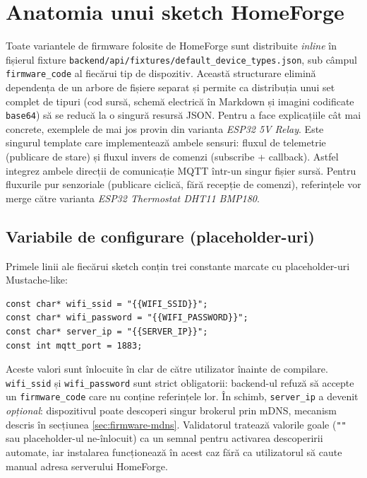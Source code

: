 \section{Anatomia unui sketch HomeForge}
Toate variantele de firmware folosite de HomeForge sunt distribuite \emph{inline} în fișierul fixture \texttt{backend/api/fixtures/default\_device\_types.json}, sub câmpul \texttt{firmware\_code} al fiecărui tip de dispozitiv. Această structurare elimină dependența de un arbore de fișiere separat și permite ca distribuția unui set complet de tipuri (cod sursă, schemă electrică în Markdown și imagini codificate \texttt{base64}) să se reducă la o singură resursă JSON. Pentru a face explicațiile cât mai concrete, exemplele de mai jos provin din varianta \emph{ESP32 5V Relay}. Este singurul template care implementează ambele sensuri: fluxul de telemetrie (publicare de stare) și fluxul invers de comenzi (subscribe + callback). Astfel integrez ambele direcții de comunicație MQTT într-un singur fișier sursă. Pentru fluxurile pur senzoriale (publicare ciclică, fără recepție de comenzi), referințele vor merge către varianta \emph{ESP32 Thermostat DHT11 BMP180}.

\subsection{Variabile de configurare (placeholder-uri)}
Primele linii ale fiecărui sketch conțin trei constante marcate cu placeholder-uri Mustache-like:
\begin{verbatim}
const char* wifi_ssid = "{{WIFI_SSID}}";
const char* wifi_password = "{{WIFI_PASSWORD}}";
const char* server_ip = "{{SERVER_IP}}";
const int mqtt_port = 1883;
\end{verbatim}
Aceste valori sunt înlocuite în clar de către utilizator înainte de compilare. \texttt{wifi\_ssid} și \texttt{wifi\_password} sunt strict obligatorii: backend-ul refuză să accepte un \texttt{firmware\_code} care nu conține referințele lor. În schimb, \texttt{server\_ip} a devenit \emph{opțional}: dispozitivul poate descoperi singur brokerul prin mDNS, mecanism descris în secțiunea \ref{sec:firmware-mdns}. Validatorul tratează valorile goale (\texttt{""} sau placeholder-ul ne-înlocuit) ca un semnal pentru activarea descoperirii automate, iar instalarea funcționează în acest caz fără ca utilizatorul să caute manual adresa serverului HomeForge.


